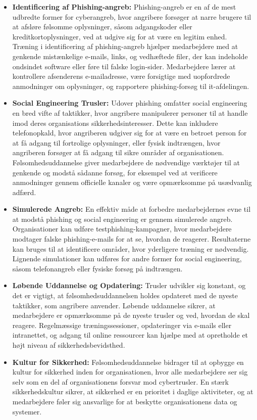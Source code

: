 \begin{itemize}
	\item \textbf{Identificering af Phishing-angreb:} Phishing-angreb er en af de mest udbredte former for cyberangreb, hvor angribere forsøger at narre brugere til at afsløre følsomme oplysninger, såsom adgangskoder eller kreditkortoplysninger, ved at udgive sig for at være en legitim enhed. Træning i identificering af phishing-angreb hjælper medarbejdere med at genkende mistænkelige e-mails, links, og vedhæftede filer, der kan indeholde ondsindet software eller føre til falske login-sider. Medarbejdere lærer at kontrollere afsenderens e-mailadresse, være forsigtige med uopfordrede anmodninger om oplysninger, og rapportere phishing-forsøg til it-afdelingen.
	
	\item \textbf{Social Engineering Trusler:} Udover phishing omfatter social engineering en bred vifte af taktikker, hvor angribere manipulerer personer til at handle imod deres organisations sikkerhedsinteresser. Dette kan inkludere telefonopkald, hvor angriberen udgiver sig for at være en betroet person for at få adgang til fortrolige oplysninger, eller fysisk indtrængen, hvor angriberen forsøger at få adgang til sikre områder af organisationen. Følsomhedsuddannelse giver medarbejdere de nødvendige værktøjer til at genkende og modstå sådanne forsøg, for eksempel ved at verificere anmodninger gennem officielle kanaler og være opmærksomme på usædvanlig adfærd.
	
	\item \textbf{Simulerede Angreb:} En effektiv måde at forbedre medarbejdernes evne til at modstå phishing og social engineering er gennem simulerede angreb. Organisationer kan udføre testphishing-kampagner, hvor medarbejdere modtager falske phishing-e-mails for at se, hvordan de reagerer. Resultaterne kan bruges til at identificere områder, hvor yderligere træning er nødvendig. Lignende simulationer kan udføres for andre former for social engineering, såsom telefonangreb eller fysiske forsøg på indtrængen.
	
	\item \textbf{Løbende Uddannelse og Opdatering:} Trusler udvikler sig konstant, og det er vigtigt, at følsomhedsuddannelsen holdes opdateret med de nyeste taktikker, som angribere anvender. Løbende uddannelse sikrer, at medarbejdere er opmærksomme på de nyeste trusler og ved, hvordan de skal reagere. Regelmæssige træningssessioner, opdateringer via e-mails eller intranettet, og adgang til online ressourcer kan hjælpe med at opretholde et højt niveau af sikkerhedsbevidsthed.
	
	\item \textbf{Kultur for Sikkerhed:} Følsomhedsuddannelse bidrager til at opbygge en kultur for sikkerhed inden for organisationen, hvor alle medarbejdere ser sig selv som en del af organisationens forsvar mod cybertrusler. En stærk sikkerhedskultur sikrer, at sikkerhed er en prioritet i daglige aktiviteter, og at medarbejdere føler sig ansvarlige for at beskytte organisationens data og systemer.
	
\end{itemize}
